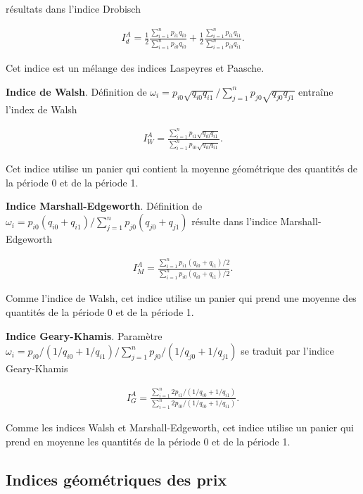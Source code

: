 \documentclass[]{article}
\begin{document}
résultats dans l'indice Drobisch

\begin{align*}
I^{A}_{d} = \frac{1}{2} \frac{\sum_{i = 1}^{n} p_{i1} q_{i0}}{\sum_{i = 1}^{n} p_{i0} q_{i0}} + \frac{1}{2} \frac{\sum_{i = 1}^{n} p_{i1} q_{i1}}{\sum_{i = 1}^{n} p_{i0} q_{i1}}.
\end{align*}

Cet indice est un mélange des indices Laspeyres et Paasche.

\textbf{Indice de Walsh}. Définition de \(\omega_{i} = p_{i0} \sqrt{q_{i0} q_{i1}} / \sum_{j = 1}^{n} p_{j0} \sqrt{q_{j0} q_{j1}}\) entraîne l'index de Walsh

\begin{align*}
I^{A}_{W} = \frac{\sum_{i = 1}^{n} p_{i1} \sqrt{q_{i0} q_{i1}}}{\sum_{i = 1}^{n} p_{i0} \sqrt{q_{i0} q_{i1}}}.
\end{align*}

Cet indice utilise un panier qui contient la moyenne géométrique des quantités de la période 0 et de la période 1.

\textbf{Indice Marshall-Edgeworth}. Définition de \(\omega_{i} = p_{i0} (q_{i0} + q_{i1}) / \sum_{j = 1}^{n} p_{j0} (q_{j0} + q_{j1})\) résulte dans l'indice Marshall-Edgeworth

\begin{align*}
I^{A}_{M} = \frac{\sum_{i = 1}^{n} p_{i1} (q_{i0} + q_{i1}) / 2}{\sum_{i = 1}^{n} p_{i0} (q_{i0} + q_{i1}) / 2}.
\end{align*}

Comme l'indice de Walsh, cet indice utilise un panier qui prend une moyenne des quantités de la période 0 et de la période 1.

\textbf{Indice Geary-Khamis}. Paramètre \(\omega_{i} = p_{i0} / (1 / q_{i0} + 1 / q_{i1}) / \sum_{j = 1}^{n} p_{j0} / (1 / q_{j0} + 1 / q_{j1})\) se traduit par l'indice Geary-Khamis

\begin{align*}
I^{A}_{G} = \frac{\sum_{i = 1}^{n} 2 p_{i1} / (1 / q_{i0} + 1 / q_{i1})}{\sum_{i = 1}^{n} 2 p_{i0} / (1 / q_{i0} + 1 / q_{i1})}.
\end{align*}

Comme les indices Walsh et Marshall-Edgeworth, cet indice utilise un panier qui prend en moyenne les quantités de la période 0 et de la période 1.

\hypertarget{indices-guxe9omuxe9triques-des-prix}{%
\subsection{Indices géométriques des prix}\label{indices-guxe9omuxe9triques-des-prix}}
\end{document}
